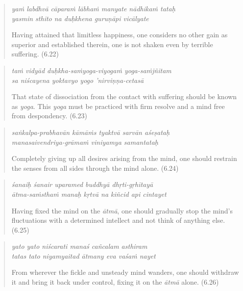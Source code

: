 \documentclass[12pt, twoside, openright]{memoir}
\begin{document}
\par
\begin{verse}
\textit{yaṁ labdhvā cāparaṁ lābhaṁ manyate nādhikaṁ tataḥ} \\
\textit{yasmin sthito na duḥkhena guruṇāpi vicālyate}

\noindent Having attained that limitless happiness, one considers no other gain as superior and established therein, one is not shaken even by terrible suffering. (6.22)
\end{verse}
\par



\par
\begin{verse}
\textit{taṁ vidyād duḥkha-saṁyoga-viyogaṁ yoga-saṁjñitam} \\
\textit{sa niścayena yoktavyo yogo ’nirviṇṇa-cetasā}

\noindent That state of dissociation from the contact with suffering should be known as \textit{yoga}. This \textit{yoga} must be practiced with firm resolve and a mind free from despondency. (6.23)
\end{verse}
\par



\par
\begin{verse}
\textit{saṅkalpa-prabhavān kāmāṁs tyaktvā sarvān aśeṣataḥ} \\
\textit{manasaivendriya-grāmaṁ viniyamya samantataḥ}

\noindent Completely giving up all desires arising from the mind, one should restrain the senses from all sides through the mind alone. (6.24)
\end{verse}
\par



\par
\begin{verse}
\textit{śanaiḥ śanair uparamed buddhyā dhṛti-gṛhītayā} \\
\textit{ātma-saṁsthaṁ manaḥ kṛtvā na kiñcid api cintayet}

\noindent Having fixed the mind on the \textit{ātmā}, one should gradually stop the mind's fluctuations with a determined intellect and not think of anything else. (6.25)
\end{verse}
\par



\par
\begin{verse}
\textit{yato yato niścarati manaś cañcalam asthiram} \\
\textit{tatas tato niyamyaitad ātmany eva vaśaṁ nayet}

\noindent From wherever the fickle and unsteady mind wanders, one should withdraw it and bring it back under control, fixing it on the \textit{ātmā} alone. (6.26)
\end{verse}
\par
\end{document}
